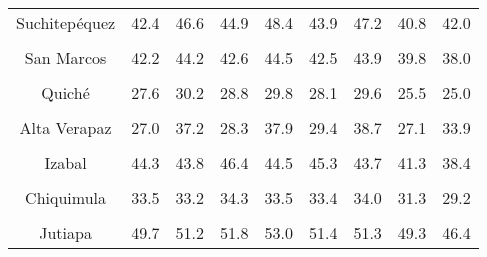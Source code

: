 \begin{tabular}[t]{ccccccccc}
Suchitepéquez & 42.4 & 46.6 & 44.9 & 48.4 & 43.9 & 47.2 & 40.8 & 42.0\\
\cellcolor[HTML]{B6B3FF}{Retalhuleu} & \cellcolor[HTML]{B6B3FF}{53.6} & \cellcolor[HTML]{B6B3FF}{54.1} & \cellcolor[HTML]{B6B3FF}{89.6} & \cellcolor[HTML]{B6B3FF}{56.8} & \cellcolor[HTML]{B6B3FF}{57.0} & \cellcolor[HTML]{B6B3FF}{55.8} & \cellcolor[HTML]{B6B3FF}{53.7} & \cellcolor[HTML]{B6B3FF}{50.7}\\
San Marcos & 42.2 & 44.2 & 42.6 & 44.5 & 42.5 & 43.9 & 39.8 & 38.0\\
\cellcolor[HTML]{B6B3FF}{Huehuetenango} & \cellcolor[HTML]{B6B3FF}{24.7} & \cellcolor[HTML]{B6B3FF}{26.4} & \cellcolor[HTML]{B6B3FF}{24.8} & \cellcolor[HTML]{B6B3FF}{25.4} & \cellcolor[HTML]{B6B3FF}{24.4} & \cellcolor[HTML]{B6B3FF}{25.0} & \cellcolor[HTML]{B6B3FF}{22.0} & \cellcolor[HTML]{B6B3FF}{20.7}\\
Quiché & 27.6 & 30.2 & 28.8 & 29.8 & 28.1 & 29.6 & 25.5 & 25.0\\
\cellcolor[HTML]{B6B3FF}{Baja Verapaz} & \cellcolor[HTML]{B6B3FF}{36.6} & \cellcolor[HTML]{B6B3FF}{41.1} & \cellcolor[HTML]{B6B3FF}{37.1} & \cellcolor[HTML]{B6B3FF}{41.2} & \cellcolor[HTML]{B6B3FF}{37.2} & \cellcolor[HTML]{B6B3FF}{39.1} & \cellcolor[HTML]{B6B3FF}{34.2} & \cellcolor[HTML]{B6B3FF}{33.4}\\
Alta Verapaz & 27.0 & 37.2 & 28.3 & 37.9 & 29.4 & 38.7 & 27.1 & 33.9\\
\cellcolor[HTML]{B6B3FF}{Petén} & \cellcolor[HTML]{B6B3FF}{40.4} & \cellcolor[HTML]{B6B3FF}{39.0} & \cellcolor[HTML]{B6B3FF}{43.7} & \cellcolor[HTML]{B6B3FF}{40.9} & \cellcolor[HTML]{B6B3FF}{42.1} & \cellcolor[HTML]{B6B3FF}{39.9} & \cellcolor[HTML]{B6B3FF}{36.3} & \cellcolor[HTML]{B6B3FF}{30.1}\\
Izabal & 44.3 & 43.8 & 46.4 & 44.5 & 45.3 & 43.7 & 41.3 & 38.4\\
\cellcolor[HTML]{B6B3FF}{Zacapa} & \cellcolor[HTML]{B6B3FF}{45.8} & \cellcolor[HTML]{B6B3FF}{46.1} & \cellcolor[HTML]{B6B3FF}{47.7} & \cellcolor[HTML]{B6B3FF}{48.4} & \cellcolor[HTML]{B6B3FF}{48.4} & \cellcolor[HTML]{B6B3FF}{48.3} & \cellcolor[HTML]{B6B3FF}{47.9} & \cellcolor[HTML]{B6B3FF}{45.2}\\
Chiquimula & 33.5 & 33.2 & 34.3 & 33.5 & 33.4 & 34.0 & 31.3 & 29.2\\
\cellcolor[HTML]{B6B3FF}{Jalapa} & \cellcolor[HTML]{B6B3FF}{36.2} & \cellcolor[HTML]{B6B3FF}{37.8} & \cellcolor[HTML]{B6B3FF}{37.7} & \cellcolor[HTML]{B6B3FF}{38.9} & \cellcolor[HTML]{B6B3FF}{36.7} & \cellcolor[HTML]{B6B3FF}{37.6} & \cellcolor[HTML]{B6B3FF}{34.7} & \cellcolor[HTML]{B6B3FF}{31.4}\\
Jutiapa & 49.7 & 51.2 & 51.8 & 53.0 & 51.4 & 51.3 & 49.3 & 46.4\\
\bottomrule
\end{tabular}
